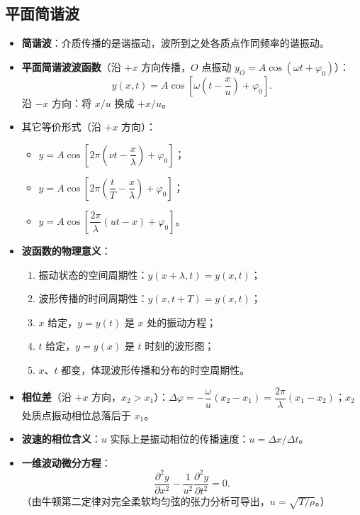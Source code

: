 \documentclass[12pt,a4paper]{ctexart}
\begin{document}
\subsection{平面简谐波}

\begin{itemize}
    \item \textbf{简谐波}：介质传播的是谐振动，波所到之处各质点作同频率的谐振动。
    \item \textbf{平面简谐波波函数}（沿 $+x$ 方向传播，$O$ 点振动 $y_O = A\cos(\omega t+\varphi_0)$）：
    \[
        y(x,t) = A\cos\!\left[\omega\!\left(t-\frac{x}{u}\right)+\varphi_0\right].
    \]
    沿 $-x$ 方向：将 $x/u$ 换成 $+x/u$。
    \item 其它等价形式（沿 $+x$ 方向）：
    \begin{itemize}
        \item $y = A\cos\!\left[2\pi\!\left(\nu t-\dfrac{x}{\lambda}\right)+\varphi_0\right]$；
        \item $y = A\cos\!\left[2\pi\!\left(\dfrac{t}{T}-\dfrac{x}{\lambda}\right)+\varphi_0\right]$；
        \item $y = A\cos\!\left[\dfrac{2\pi}{\lambda}(ut-x)+\varphi_0\right]$。
    \end{itemize}
    \item \textbf{波函数的物理意义}：
    \begin{enumerate}
        \item 振动状态的空间周期性：$y(x+\lambda,t) = y(x,t)$；
        \item 波形传播的时间周期性：$y(x,t+T) = y(x,t)$；
        \item $x$ 给定，$y=y(t)$ 是 $x$ 处的振动方程；
        \item $t$ 给定，$y=y(x)$ 是 $t$ 时刻的波形图；
        \item $x$、$t$ 都变，体现波形传播和分布的时空周期性。
    \end{enumerate}
    \item \textbf{相位差}（沿 $+x$ 方向，$x_2>x_1$）：$\Delta\varphi = -\dfrac{\omega}{u}(x_2-x_1) = \dfrac{2\pi}{\lambda}(x_1-x_2)$；$x_2$ 处质点振动相位总落后于 $x_1$。
    \item \textbf{波速的相位含义}：$u$ 实际上是振动相位的传播速度：$u = \Delta x/\Delta t$。
    \item \textbf{一维波动微分方程}：
    \[
        \frac{\partial^2 y}{\partial x^2} - \frac{1}{u^2}\frac{\partial^2 y}{\partial t^2} = 0.
    \]
    （由牛顿第二定律对完全柔软均匀弦的张力分析可导出，$u = \sqrt{T/\rho}$。）
\end{itemize}
\end{document}
